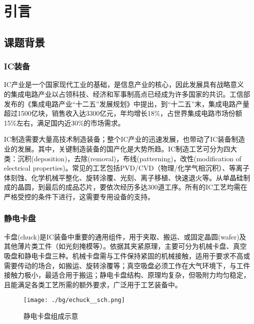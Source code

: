 \cleardoublepage
\chapter{引言}\label{ch:bg}



\section{课题背景}


\subsection{IC装备}

IC产业是一个国家现代工业的基础，是信息产业的核心，因此发展具有战略意义的集成电路产业以占领科技、经济和军事制高点已经成为许多国家的共识。工信部发布的《集成电路产业“十二五”发展规划》中提出，到“十二五”末，集成电路产量超过1500亿块，销售收入达3300亿元，年均增长18\%，占世界集成电路市场份额15\%左右，满足国内近30\%的市场需求。

IC制造需要大量高技术制造装备；整个IC产业的迅速发展，也带动了IC装备制造业的发展。其中，关键制造装备的国产化是大势所趋。IC制造工艺可分为四大类：沉积(deposition)，去除(removal)，布线(patterning)，改性(modification of electrical properties)。常见的工艺包括PVD/CVD（物理/化学气相沉积）、等离子体刻蚀、化学机械平整化、旋转涂覆、光刻、离子移植、快速退火等。从单晶硅制成的晶圆，到最后的成品芯片，要依次经历多达300道工序。所有的IC工艺均需在严格受控的条件下进行，这需要专用设备的支持。


\subsection{静电卡盘}\label{sec:intro-echuck}

卡盘(chuck)是IC装备中重要的通用组件，用于夹取、搬运、或固定晶圆(wafer)及其他薄片类工件（如光刻掩模等）。依据其夹紧原理，主要可分为机械卡盘、真空吸盘和静电卡盘三种。机械卡盘需与工件保持紧固的机械接触，适用于要求不高或需要传动的场合，如搬运、旋转涂覆等；真空吸盘必须工作在大气环境下，与工件接触力极小，最适合用于搬运；静电卡盘结构、原理均复杂，但吸附力均匀稳定，且能满足各类工艺所需的额外要求，广泛用于工艺装备中。

\begin{figure}[hbt]
\centering
\texttt{[image: ./bg/echuck\_\_sch.png]}
\caption{静电卡盘组成示意}
\label{fig:echuck__sch}
\end{figure}

